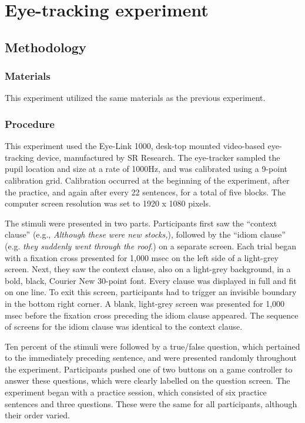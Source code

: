 \documentclass[output=paper
,modfonts
,nonflat]{langsci/langscibook}
\begin{document}



\section{Eye-tracking experiment}
\subsection{Methodology}

\subsubsection{Materials}
This experiment utilized the same materials as the previous experiment.


\subsubsection{Procedure}

This experiment used the Eye-Link 1000, desk-top mounted video-based eye-tracking device, manufactured by SR Research. The eye-tracker sampled the pupil location and size at a rate of 1000Hz, and was calibrated using a 9-point calibration grid. Calibration occurred at the beginning of the experiment, after the practice, and again after every 22 sentences, for a total of five blocks. The computer screen resolution was set to 1920 x 1080 pixels.

The stimuli were presented in two parts. Participants first saw the ``context clause'' (e.g., \textit{ Although these were new stocks,}), followed by the ``idiom clause'' (e.g. \textit{they suddenly went through the roof}.) on a separate screen. Each trial began with a fixation cross presented for 1,000 msec on the left side of a light-grey screen. Next, they saw the context clause, also on a light-grey background, in a bold, black, Courier New 30-point font. Every clause was displayed in full and fit on one line. To exit this screen, participants had to trigger an invisible boundary in the bottom right corner. A blank, light-grey screen was presented for 1,000 msec before the fixation cross preceding the idiom clause appeared. The sequence of screens for the idiom clause was identical to the context clause.  

Ten percent of the stimuli were followed by a true/false  question, which pertained to the immediately preceding sentence, and were presented randomly throughout the experiment. Participants pushed one of two buttons on a game controller to answer these questions, which were clearly labelled on the question screen. The experiment began with a practice session, which consisted of six practice sentences and three questions. These were the same for all participants, although their order varied. 
\end{document}
